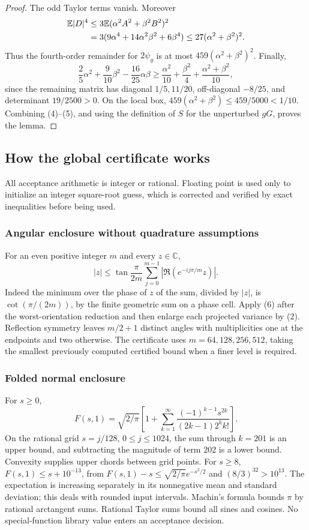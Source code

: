 \begin{proof}
The odd Taylor terms vanish. Moreover
\begin{align*}
 \mathbb E|D|^4
 &\le3\mathbb E(\alpha^2A^2+\beta^2B^2)^2\\
 &=3(9\alpha^4+14\alpha^2\beta^2+6\beta^4)
 \le27(\alpha^2+\beta^2)^2.
\end{align*}
Thus the fourth-order remainder for $2\psi_g$ is at most
$459(\alpha^2+\beta^2)^2$.
Finally,
\[
 \frac25\alpha^2+\frac9{10}\beta^2-\frac{16}{25}\alpha\beta
 \ge\frac{\alpha^2}{10}+\frac{\beta^2}{4}
                +\frac{\alpha^2+\beta^2}{10},              \tag{5}
\]
since the remaining matrix has diagonal $1/5,11/20$, off-diagonal
$-8/25$, and determinant $19/2500>0$. On the local box,
$459(\alpha^2+\beta^2)\le459/5000<1/10$.
Combining (4)--(5), and using the definition of $S$ for the unperturbed
$gG$, proves the lemma.
\end{proof}

\subsection{How the global certificate works}
All acceptance arithmetic is integer or rational. Floating point is
used only to initialize an integer square-root guess, which is corrected
and verified by exact inequalities before being used.

\subsubsection{Angular enclosure without quadrature assumptions}
For an even positive integer $m$ and every $z\in\mathbb C$,
\[
 |z|\le\tan\frac\pi{2m}\sum_{j=0}^{m-1}
             |\Re(e^{-ij\pi/m}z)|.                         \tag{6}
\]
Indeed the minimum over the phase of $z$ of the sum, divided by $|z|$,
is $\cot(\pi/(2m))$, by the finite geometric sum on a phase cell.
Apply (6) after the worst-orientation reduction and then enlarge each
projected variance by (2). Reflection symmetry leaves $m/2+1$ distinct
angles with multiplicities one at the endpoints and two otherwise.
The certificate uses $m=64,128,256,512$, taking the smallest previously
computed certified bound when a finer level is required.

\subsubsection{Folded normal enclosure}
For $s\ge0$,
\[
 F(s,1)=\sqrt{2/\pi}\left[
 1+\sum_{k=1}^\infty\frac{(-1)^{k-1}s^{2k}}{(2k-1)2^k k!}\right].
\]
On the rational grid $s=j/128$, $0\le j\le1024$, the sum through
$k=201$ is an upper bound, and subtracting the magnitude of term 202
is a lower bound. Convexity supplies upper chords between grid points.
For $s\ge8$, $F(s,1)\le s+10^{-13}$, from
$F(s,1)-s\le\sqrt{2/\pi}e^{-s^2/2}$ and $(8/3)^{32}>10^{13}$.
The expectation is increasing separately in its nonnegative mean and
standard deviation; this deals with rounded input intervals.
Machin's formula bounds $\pi$ by rational arctangent sums. Rational
Taylor sums bound all sines and cosines. No special-function library
value enters an acceptance decision.

